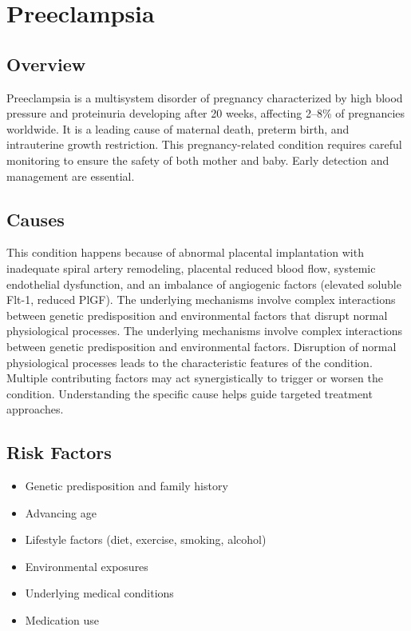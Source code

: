 \chapter{Preeclampsia}
\label{sec:Preeclampsia}

\section{Overview}
Preeclampsia is a multisystem disorder of pregnancy characterized by high blood pressure and proteinuria developing after 20 weeks, affecting 2--8\% of pregnancies worldwide. It is a leading cause of maternal death, preterm birth, and intrauterine growth restriction. This pregnancy-related condition requires careful monitoring to ensure the safety of both mother and baby. Early detection and management are essential.
\section{Causes}
This condition happens because of abnormal placental implantation with inadequate spiral artery remodeling, placental reduced blood flow, systemic endothelial dysfunction, and an imbalance of angiogenic factors (elevated soluble Flt-1, reduced PlGF). The underlying mechanisms involve complex interactions between genetic predisposition and environmental factors that disrupt normal physiological processes. The underlying mechanisms involve complex interactions between genetic predisposition and environmental factors. Disruption of normal physiological processes leads to the characteristic features of the condition. Multiple contributing factors may act synergistically to trigger or worsen the condition. Understanding the specific cause helps guide targeted treatment approaches.
\section{Risk Factors}


\begin{itemize}[noitemsep]
  \item Genetic predisposition and family history
  \item Advancing age
  \item Lifestyle factors (diet, exercise, smoking, alcohol)
  \item Environmental exposures
  \item Underlying medical conditions
  \item Medication use
\end{itemize}
